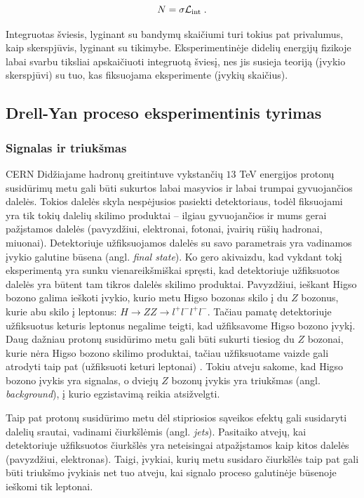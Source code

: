 \documentclass[a4paper, 12pt]{article}
\newcommand{\Lumi}{{\cal L}_\mathrm{int}}
\newlength\q
\begin{document}
\begin{equation}
	N=\sigma\Lumi \; .
\label{eq:evno}
\end{equation}

Integruotas šviesis, lyginant su bandymų skaičiumi turi tokius pat privalumus, kaip skerspjūvis,
lyginant su tikimybe.
Eksperimentinėje didelių energijų fizikoje labai svarbu tiksliai apskaičiuoti integruotą šviesį,
nes jis susieja teoriją (įvykio skerspjūvi) su tuo, kas fiksuojama eksperimente (įvykių skaičius).


\subsection{Drell-Yan proceso eksperimentinis tyrimas}

\subsubsection{Signalas ir triukšmas}\label{sec:SignalBkg}

CERN Didžiajame hadronų greitintuve vykstančių $13$ TeV energijos protonų susidūrimų metu gali
būti sukurtos labai masyvios ir labai trumpai gyvuojančios dalelės.
Tokios dalelės skyla nespėjusios pasiekti detektoriaus, todėl fiksuojami yra tik tokių dalelių
skilimo produktai -- ilgiau gyvuojančios ir mums gerai pažįstamos dalelės (pavyzdžiui,
elektronai, fotonai, įvairių rūšių hadronai, miuonai).
Detektoriuje užfiksuojamos dalelės su savo parametrais yra vadinamos įvykio galutine būsena
(angl. \textit{final state}).
Ko gero akivaizdu, kad vykdant tokį eksperimentą yra sunku vienareikšmiškai spręsti, kad
detektoriuje užfiksuotos dalelės yra būtent tam tikros dalelės skilimo produktai.
Pavyzdžiui, ieškant Higso bozono galima ieškoti įvykio, kurio metu Higso bozonas skilo į du
$Z$ bozonus, kurie abu skilo į leptonus: $H \rightarrow ZZ \rightarrow l^{+}l^{-}l^{+}l^{-}$.
Tačiau pamatę detektoriuje užfiksuotus keturis leptonus negalime teigti, kad užfiksavome
Higso bozono įvykį.
Daug dažniau protonų susidūrimo metu gali būti sukurti tiesiog du $Z$ bozonai, kurie nėra
Higso bozono skilimo produktai, tačiau užfiksuotame vaizde gali atrodyti taip pat (užfiksuoti
keturi leptonai) \cite{HiggsEX}.
Tokiu atveju sakome, kad Higso bozono įvykis yra signalas, o dviejų $Z$ bozonų įvykis yra
triukšmas (angl. \textit{background}), į kurio egzistavimą reikia atsižvelgti.

Taip pat protonų susidūrimo metu dėl stipriosios sąveikos efektų gali susidaryti dalelių
srautai, vadinami čiurkšlėmis (angl. \textit{jets}).
Pasitaiko atvejų, kai detektoriuje užfiksuotos čiurkšlės yra neteisingai atpažįstamos kaip
kitos dalelės (pavyzdžiui, elektronas).
Taigi, įvykiai, kurių metu susidaro čiurkšlės taip pat gali būti triukšmo įvykiais net tuo
atveju, kai signalo proceso galutinėje būsenoje ieškomi tik leptonai.
\end{document}
